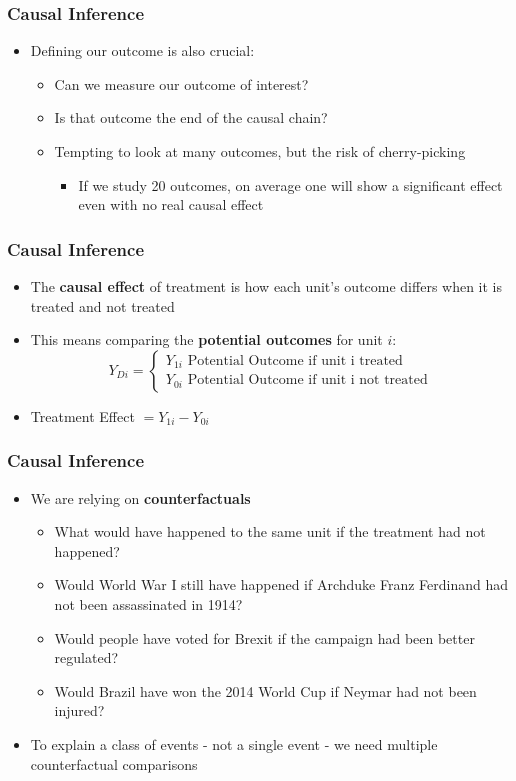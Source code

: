 \documentclass[xcolor=x11names,compress]{beamer}\usepackage[]{graphicx}\usepackage[]{color}
\renewcommand{\(}{\begin{columns}}
\renewcommand{\)}{\end{columns}}
\newcommand{\<}[1]{\begin{column}{#1}}
\renewcommand{\>}{\end{column}}
\begin{document}
\begin{frame}
\frametitle{Causal Inference}
\begin{itemize}
\item Defining our outcome is also crucial:
\pause
\begin{itemize}
\item Can we measure our outcome of interest?
\pause
\item Is that outcome the end of the causal chain?
\pause
\item Tempting to look at many outcomes, but the risk of cherry-picking
\pause
\begin{itemize}
\item If we study 20 outcomes, on average one will show a significant effect even with no real causal effect
\end{itemize}
\end{itemize}
\end{itemize}
\end{frame}

\begin{frame}
\frametitle{Causal Inference}
\begin{itemize}
\item The \textbf{causal effect} of treatment is how each unit's outcome differs when it is treated and not treated
\pause
\item This means comparing the \textbf{potential outcomes} for unit $i$:
\[
Y_{Di} = 
\begin{cases}
Y_{1i}\text{   Potential Outcome if unit i treated} \\
Y_{0i}\text{   Potential Outcome if unit i not treated}
\end{cases}
\]
\item Treatment Effect $ = Y_{1i} - Y_{0i}$
\end{itemize}
\end{frame}

\begin{frame}
\frametitle{Causal Inference}
\begin{itemize}
\item We are relying on \textbf{counterfactuals}
\pause
\begin{itemize}
\item What would have happened to the same unit if the treatment had not happened?
\pause
\item Would World War I still have happened if Archduke Franz Ferdinand had not been assassinated in 1914?
\pause
\item Would people have voted for Brexit if the campaign had been better regulated? 
\pause
\item Would Brazil have won the 2014 World Cup if Neymar had not been injured?
\pause
\end{itemize}
\item To explain a class of events - not a single event - we need multiple counterfactual comparisons
\end{itemize}
\end{frame}
\end{document}
